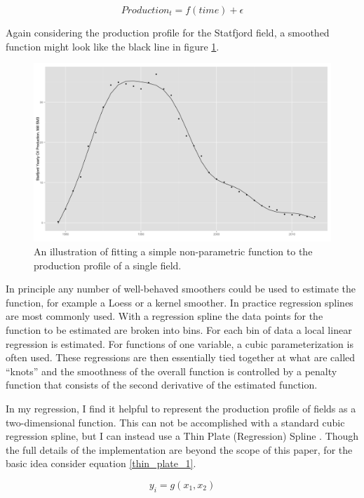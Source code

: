 \documentclass[12pt]{article}
\begin{document}
\begin{equation}
Production_{t}=f(time) + \epsilon
	\label{simp_eqn}
\end{equation}

Again considering the production profile for the Statfjord field, a smoothed function might look like the black line in figure \ref{statfjord_gam}.   

\begin{figure}
	\includegraphics[width=.8\textwidth]{figures/statfjord_gam_print.png}
	\caption{An illustration of fitting a simple non-parametric function to the production profile of a single field.}
	\label{statfjord_gam}
\end{figure}

In principle any number of well-behaved smoothers could be used to estimate the function, for example a Loess or a kernel smoother.  In practice regression splines are most commonly used.  With a regression spline the data points for the function to be estimated are broken into bins.  For each bin of data a local linear regression is estimated.  For functions of one variable, a cubic parameterization is often used.  These regressions are then essentially tied together at what are called “knots” and the smoothness of the overall function is controlled by a penalty function that consists of the second derivative of the estimated function.

In my regression, I find it helpful to represent the production profile of fields as a two-dimensional function.  This can not be accomplished with a standard cubic regression spline, but I can instead use a Thin Plate (Regression) Spline \citet{wood_thin_2003}.  Though the full details of the implementation are beyond the scope of this paper, for the basic idea consider equation \ref{thin_plate_1}.  

	\begin{equation}
	y_i = g(x_1, x_2)
	\label{thin_plate_1}
	\end{equation}
\end{document}
